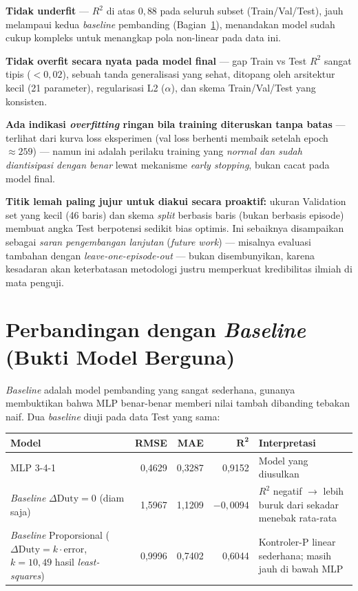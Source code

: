 \documentclass[11pt,a4paper]{article}
\begin{document}
\begin{verdictbox}
\textbf{Tidak underfit} --- $R^2$ di atas $0{,}88$ pada seluruh subset (Train/Val/Test),
jauh melampaui kedua \emph{baseline} pembanding (Bagian~\ref{sec:baseline}), menandakan
model sudah cukup kompleks untuk menangkap pola non-linear pada data ini.

\textbf{Tidak overfit secara nyata pada model final} --- gap Train vs Test $R^2$ sangat
tipis ($<0{,}02$), sebuah tanda generalisasi yang sehat, ditopang oleh arsitektur kecil
(21 parameter), regularisasi L2 ($\alpha$), dan skema Train/Val/Test yang konsisten.

\textbf{Ada indikasi \emph{overfitting} ringan bila training diteruskan tanpa batas} ---
terlihat dari kurva loss eksperimen (val loss berhenti membaik setelah epoch
$\approx259$) --- namun ini adalah perilaku training yang \emph{normal dan sudah
diantisipasi dengan benar} lewat mekanisme \emph{early stopping}, bukan cacat pada model
final.

\textbf{Titik lemah paling jujur untuk diakui secara proaktif:} ukuran Validation set
yang kecil (46 baris) dan skema \emph{split} berbasis baris (bukan berbasis episode)
membuat angka Test berpotensi sedikit bias optimis. Ini sebaiknya disampaikan sebagai
\emph{saran pengembangan lanjutan} (\emph{future work}) --- misalnya evaluasi tambahan
dengan \emph{leave-one-episode-out} --- bukan disembunyikan, karena kesadaran akan
keterbatasan metodologi justru memperkuat kredibilitas ilmiah di mata penguji.
\end{verdictbox}

\section{Perbandingan dengan \emph{Baseline} (Bukti Model Berguna)}
\label{sec:baseline}

\emph{Baseline} adalah model pembanding yang sangat sederhana, gunanya membuktikan bahwa
MLP benar-benar memberi nilai tambah dibanding tebakan naif. Dua \emph{baseline} diuji
pada data Test yang sama:

\begin{center}
\begin{tabular}{@{}p{3.5cm} r r r p{4.0cm}@{}}
\toprule
\textbf{Model} & \textbf{RMSE} & \textbf{MAE} & $\bm{R^2}$ & \textbf{Interpretasi} \\
\midrule
MLP 3-4-1 & 0,4629 & 0,3287 & 0,9152 & Model yang diusulkan \\
\addlinespace
\emph{Baseline} $\Delta\mathrm{Duty}=0$ (diam saja) & 1,5967 & 1,1209 & $-0{,}0094$ &
$R^2$ negatif $\to$ lebih buruk dari sekadar menebak rata-rata \\
\addlinespace
\emph{Baseline} Proporsional ($\Delta\mathrm{Duty}=k\cdot\mathrm{error}$, $k=10{,}49$
hasil \emph{least-squares}) & 0,9996 & 0,7402 & 0,6044 & Kontroler-P linear sederhana;
masih jauh di bawah MLP \\
\bottomrule
\end{tabular}
\end{center}
\end{document}
